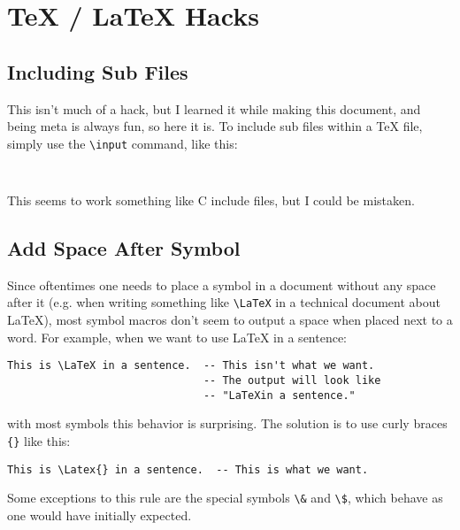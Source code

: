 \section*{\TeX{} / \LaTeX{} Hacks}
\subsection*{Including Sub Files}
This isn't much of a hack, but I learned it while making this document, and being meta is always fun, so here it is. To include sub files within a \TeX{} file, simply use the {\tt \textbackslash input} command, like this:
\begin{verbatim}


\end{verbatim}
This seems to work something like C include files, but I could be mistaken.

\subsection*{Add Space After Symbol}
Since oftentimes one needs to place a symbol in a document without any space after it (e.g. when writing something like {\tt \textbackslash LaTeX} in a technical document about \LaTeX), most symbol macros don't seem to output a space when placed next to a word. For example, when we want to use \LaTeX{} in a sentence:
\begin{verbatim}
This is \LaTeX in a sentence.  -- This isn't what we want.
                               -- The output will look like
                               -- "LaTeXin a sentence."
\end{verbatim}
with most symbols this behavior is surprising. The solution is to use curly braces {\tt \{\}} like this:
\begin{verbatim}
This is \Latex{} in a sentence.  -- This is what we want.
\end{verbatim}
Some exceptions to this rule are the special symbols {\tt \textbackslash \&} and {\tt \textbackslash \$}, which behave as one would have initially expected.  %
